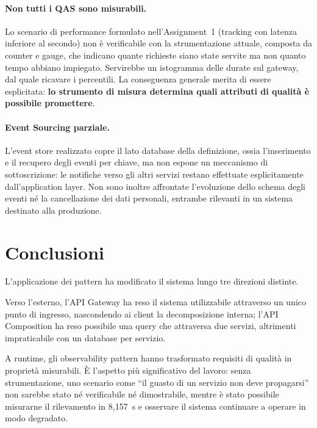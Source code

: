 \documentclass[12pt,a4paper]{article}
\begin{document}
\paragraph{Non tutti i QAS sono misurabili.} Lo scenario di performance formulato nell'Assignment~1
(tracking con latenza inferiore al secondo) non \`e verificabile con la strumentazione attuale,
composta da counter e gauge, che indicano quante richieste siano state servite ma non quanto tempo
abbiano impiegato. Servirebbe un istogramma delle durate sul gateway, dal quale ricavare i percentili.
La conseguenza generale merita di essere esplicitata: \textbf{lo strumento di misura determina quali
attributi di qualit\`a \`e possibile promettere}.

\paragraph{Event Sourcing parziale.} L'event store realizzato copre il lato database della
definizione, ossia l'inserimento e il recupero degli eventi per chiave, ma non espone un meccanismo di
sottoscrizione: le notifiche verso gli altri servizi restano effettuate esplicitamente dall'application
layer. Non sono inoltre affrontate l'evoluzione dello schema degli eventi n\'e la cancellazione dei
dati personali, entrambe rilevanti in un sistema destinato alla produzione.

\section{Conclusioni}

L'applicazione dei pattern ha modificato il sistema lungo tre direzioni distinte.

Verso l'esterno, l'API Gateway ha reso il sistema utilizzabile attraverso un unico punto di ingresso,
nascondendo ai client la decomposizione interna; l'API Composition ha reso possibile una query che
attraversa due servizi, altrimenti impraticabile con un database per servizio.

A runtime, gli observability pattern hanno trasformato requisiti di qualit\`a in propriet\`a
misurabili. \`E l'aspetto pi\`u significativo del lavoro: senza strumentazione, uno scenario come
``il guasto di un servizio non deve propagarsi'' non sarebbe stato n\'e verificabile n\'e
dimostrabile, mentre \`e stato possibile misurarne il rilevamento in 8,157~s e osservare il sistema
continuare a operare in modo degradato.
\end{document}
